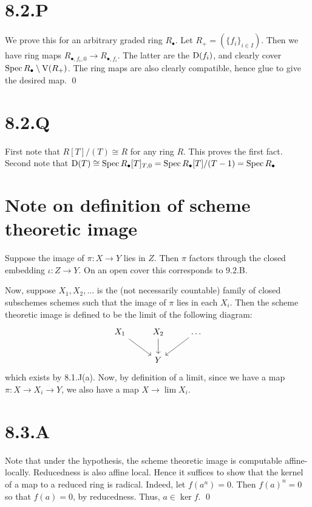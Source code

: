 \documentclass{article}
\begin{document}
\section{8.2.P}
We prove this for an arbitrary graded ring $R_{\bullet}$. Let
$R_+=(\{f_i\}_{i \in I})$. Then we have ring maps $R_{\bullet, f_i, 0} \to R_{\bullet, f_i}$. The
latter are the $\operatorname{D}(f_i)$, and clearly cover
$\operatorname{Spec} R_{\bullet} \setminus \operatorname{V}(R_+)$. The ring maps are also clearly compatible, hence glue
to give the desired map. \qed

\section{8.2.Q}
First note that $R[T]/(T) \cong R$ for any ring $R$.
This proves the first fact. Second note that $\operatorname{D}(T) \cong \operatorname{Spec} R_{\bullet}[T]_{T, 0} = \operatorname{Spec}
    R_{\bullet}[T]/(T-1)=\operatorname{Spec} R_{\bullet}$

\section{Note on definition of scheme theoretic image}
Suppose the image of $\pi: X \to Y$ lies in $Z$.
Then $\pi$ factors through the closed embedding
$\iota: Z \to Y$. On an open cover this corresponds to 9.2.B.

Now, suppose $X_1, X_2, \dots$ is the (not necessarily countable) family
of closed subschemes schemes such that the image of $\pi$
lies in each $X_i$. Then the scheme theoretic image is
defined to be the limit of the following diagram: \[\begin{tikzcd}
        {X_1} & {X_2} & \dots \\
              & Y
        \arrow[from=1-1, to=2-2]
        \arrow[from=1-2, to=2-2]
        \arrow[from=1-3, to=2-2]
    \end{tikzcd}\] which
exists by 8.1.J(a). Now, by definition of a limit, since we have a map
$\pi: X \to X_i \to Y$, we also have a map $X \to \lim X_i$.

\section{8.3.A}
Note that under the hypothesis, the scheme theoretic image is computable
affine-locally. Reducedness is also affine local. Hence it suffices to show
that the kernel of a map to a reduced ring is radical. Indeed, let
$f(a^n)=0$. Then $f(a)^n=0$ so that
$f(a)=0$, by reducedness. Thus, $a \in \ker f$. \qed
\end{document}
